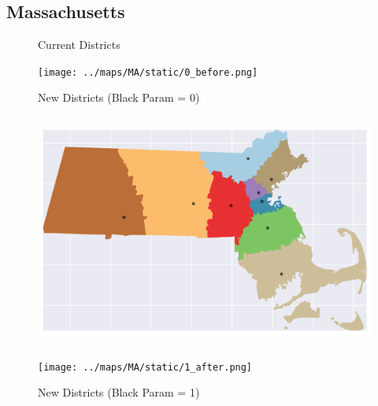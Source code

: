 \subsection{Massachusetts}
\begin{figure}[htb!] \centering
\caption{ Current Districts }
\texttt{[image: ../maps/MA/static/0\_before.png]}
\caption{ New Districts (Black Param = 0) }
\includegraphics[width=5in,height=3in,keepaspectratio]{../maps/MA/static/0_after.png}
\caption{ New Districts (Black Param = 1) }
\texttt{[image: ../maps/MA/static/1\_after.png]}
\end{figure}

\clearpage
\newpage

